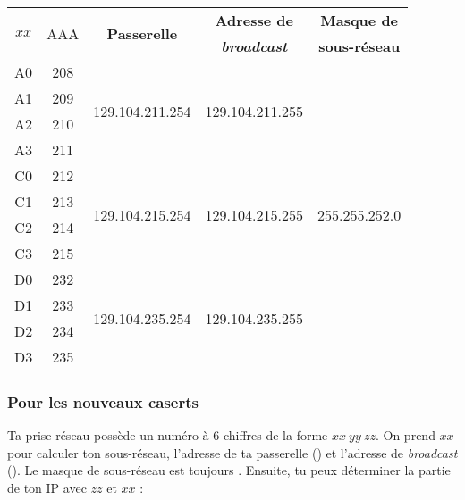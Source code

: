 \begin{center}
\begin{tabular}{|c|c|c|c|c|}
\hline \multirow{2}{*}{$xx$} & \multirow{2}{*}{AAA} & \multirow{2}{*}{\bf Passerelle} & \bf Adresse de  & \bf Masque de  \\ 
 & & & \bf{\em broadcast} & \bf sous-réseau \\
\hline A0 & 208 & \multirow{4}{*}{129.104.211.254} & \multirow{4}{*}{129.104.211.255} & \multirow{12}{*}{255.255.252.0} \\ 
\cline{1-2} A1 & 209 &  &  &  \\ 
\cline{1-2} A2 & 210 &  &  &  \\ 
\cline{1-2} A3 & 211 &  &  &  \\ 
\cline{1-4}  C0 & 212  & \multirow{4}{*}{129.104.215.254} & \multirow{4}{*}{129.104.215.255} & \\ 
\cline{1-2} C1 & 213 &  &  &  \\ 
\cline{1-2} C2 & 214 &  &  &  \\ 
\cline{1-2} C3 & 215 &  &  &  \\ 
\cline{1-4}  D0 & 232  & \multirow{4}{*}{129.104.235.254} & \multirow{4}{*}{129.104.235.255} & \\ 
\cline{1-2} D1 & 233 &  &  &  \\ 
\cline{1-2} D2 & 234 &  &  &  \\ 
\cline{1-2} D3 & 235 &  &  &  \\ 
\hline
\end{tabular} 
\end{center}



\subsubsection{Pour les nouveaux caserts}

Ta prise r\'eseau poss\`ede un num\'ero \`a 6 chiffres de la forme $xx\ yy\ zz$. On prend $xx$ pour calculer ton sous-r\'eseau, l'adresse de ta passerelle
() et l'adresse de \emph{broadcast} (). Le masque de sous-r\'eseau est toujours
. Ensuite, tu peux d\'eterminer la partie  de ton IP avec $zz$ et $xx$ :


